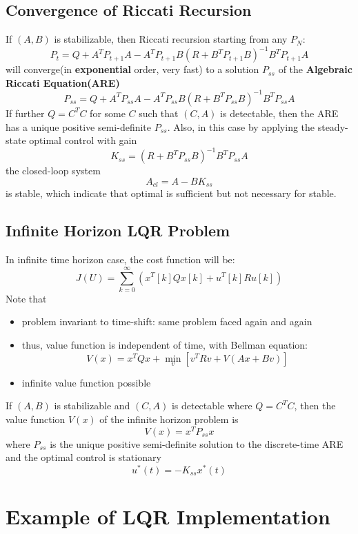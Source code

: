 \documentclass[10pt,a4paper,oneside]{article}
\begin{document}
\subsection{Convergence of Riccati Recursion}
If $(A,B)$ is stabilizable, then Riccati recursion starting from any $P_N$:
\[
P_t=Q+A^TP_{t+1}A - A^TP_{t+1}B(R+B^TP_{t+1}B)^{-1}B^TP_{t+1}A
\]
will converge(in \textbf{exponential} order, very fast) to a solution $P_{ss}$ of the {\bfseries Algebraic Riccati Equation(ARE)}
\[
P_{ss}=Q+A^TP_{ss}A - A^TP_{ss}B(R+B^TP_{ss}B)^{-1}B^TP_{ss}A
\]
If further $Q=C^TC$ for some $C$ such that $(C,A)$ is detectable, then the ARE has a unique positive semi-definite $P_{ss}$. Also, in this case by applying the steady-state optimal control with gain
\[
K_{ss}=(R+B^TP_{ss}B)^{-1}B^TP_{ss}A
\]
the closed-loop system 
\[
A_{cl}=A-BK_{ss}
\] 
is stable, which indicate that optimal is sufficient but not necessary for stable.

\subsection{Infinite Horizon LQR Problem}

In infinite time horizon case, the cost function will be:
\[
J(U)=\sum_{k=0}^{\infty}\left(x^{T}[k] Q x[k]+u^{T}[k] R u[k]\right)
\]
Note that
\begin{itemize}
	\item problem invariant to time-shift: same problem faced again and again
	\item thus, value function is independent of time, with Bellman equation:
	\[
	V(x)=x^{T} Q x+\min _{v}\left[v^{T} R v+V(A x+B v)\right]
	\]
	\item infinite value function possible
\end{itemize}
If $(A,B)$ is stabilizable and $(C,A)$ is detectable where $Q=C^TC$, then the value function $V(x)$ of the infinite horizon problem is 
\[
V(x)=x^TP_{ss}x
\]
where $P_{ss}$ is the unique positive semi-definite solution to the discrete-time ARE and the optimal control is stationary 
\[
u^*(t)=-K_{ss}x^*(t)
\]


\section{Example of LQR Implementation}
\end{document}
